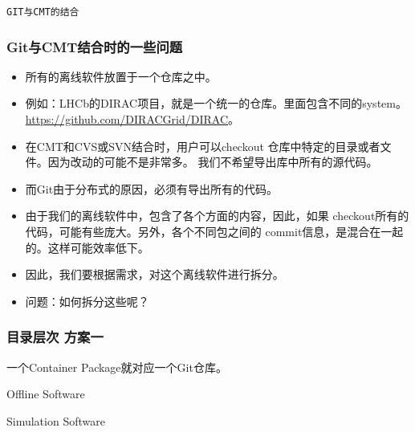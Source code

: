 \begin{frame}
    \begin{center}
        \LARGE \tt{GIT与CMT的结合}
    \end{center}
\end{frame}

\begin{frame}
    \frametitle{Git与CMT结合时的一些问题}
    \begin{itemize}    
        \item 所有的离线软件放置于一个仓库之中。
        \item 例如：LHCb的DIRAC项目，就是一个统一的仓库。里面包含不同的system。
              \url{https://github.com/DIRACGrid/DIRAC}。
        \item 在CMT和CVS或SVN结合时，用户可以checkout
              仓库中特定的目录或者文件。因为改动的可能不是非常多。
              我们不希望导出库中所有的源代码。
        \item 而Git由于分布式的原因，必须有导出所有的代码。
        \item 由于我们的离线软件中，包含了各个方面的内容，因此，如果
              checkout所有的代码，可能有些庞大。另外，各个不同包之间的
              commit信息，是混合在一起的。这样可能效率低下。
        \item 因此，我们要根据需求，对这个离线软件进行拆分。
        \item 问题：如何拆分这些呢？
    \end{itemize}
\end{frame}

\begin{frame}
    \frametitle{目录层次 方案一}
    一个Container Package就对应一个Git仓库。
    \renewcommand*\DTstylecomment{\rmfamily\color{red}\textsc}
    \begin{block}{Offline Software}
    \end{block}

    \begin{block}{Simulation Software}
    \end{block}
\end{frame}

